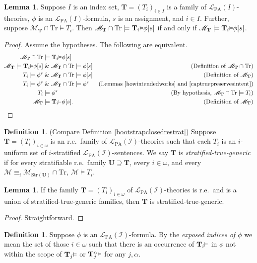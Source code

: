 \documentclass[reqno]{article}
\theoremstyle{definition}
\newtheorem{lemma}[theorem]{Lemma}
\newtheorem{definition}[theorem]{Definition}
\def\L{\mathscr{L}}
\def\M{\mathscr{M}}
\def\T{\mathbf{T}}
\def\U{\mathbf{U}}
\def\LPA{\L_{\mathrm{PA}}}
\def\indset{\mathcal I}
\def\Tr{\mathrm{Tr}}
\def\ctr{\cap\Tr}
\def\myequiv{\equiv}
\renewcommand{\Pr}[1]{\T_{#1}\mbox{\small${\vDash}$}}
\newcommand{\Prr}[2]{\T^{#1}_{#2}\mbox{\small${\vDash}$}}
\newcommand{\str}[1]{\mathrm{Str}(#1)} \newcommand{\Str}[1]{\str{#1}}
\begin{document}
\begin{lemma}
\label{captragrees}
Suppose $I$ is an index set,
$\T=(T_i)_{i\in I}$ is a family of $\LPA(I)$-theories,
$\phi$ is an $\LPA(I)$-formula, $s$ is an assignment, and $i\in I$.
Further, suppose $\M_\T\ctr\models T_i$.
Then $\M_\T\ctr\models\Pr i\phi[s]$ if and only if $\M_\T\models\Pr i\phi[s]$.
\end{lemma}

\begin{proof}
Assume the hypotheses.  The following are equivalent.
\begin{align*}
\M_\T\ctr &\models \Pr i\phi[s]\\
\M_\T \models \Pr i\phi[s] &\mathrel\& \M_\T\ctr\models \phi[s]
  &\mbox{(Definition of $\M_\T\ctr$)}\\
T_i \models \phi^s &\mathrel\& \M_\T\ctr\models \phi[s]
  &\mbox{(Definition of $\M_\T$)}\\
T_i \models \phi^s &\mathrel\& \M_\T\ctr\models \phi^s
  &\mbox{(Lemmas \ref{howintendedworks} and \ref{captruepreservesintent})}\\
T_i &\models \phi^s
  &\mbox{(By hypothesis, $\M_\T\ctr\models T_i$)}\\
\M_\T &\models \Pr i\phi[s].
  &\mbox{(Definition of $\M_\T$)}
\end{align*}
\end{proof}



\begin{definition}
(Compare Definition \ref{bootstrapclosedrestrat})
Suppose $\T=(T_i)_{i\in\omega}$ is an r.e.~family of $\LPA(\indset)$-theories
such that each $T_i$ is an $i$-uniform set of $i$-stratified $\LPA(\indset)$-sentences.
We say $\T$ is \emph{stratified-true-generic} if for every stratifiable r.e.~family
$\U\supseteq\T$, every $i\in\omega$, and every $\M\myequiv_i\M_{\str\U}\ctr$, $\M\models T_i$.
\end{definition}

\begin{lemma}
If the family $\T=(T_i)_{i\in\omega}$ of $\LPA(\indset)$-theories is r.e.~and is a union of stratified-true-generic families,
then $\T$ is stratified-true-generic.
\end{lemma}

\begin{proof}
Straightforward.
\end{proof}

\begin{definition}
Suppose $\phi$ is an $\LPA(\indset)$-formula.
By the \emph{exposed indices of $\phi$} we mean the set of those $i\in\omega$ such
that there is an occurrence of $\Pr i$ in $\phi$ not within the scope of
$\Pr j$ or $\Prr\alpha j$ for any $j,\alpha$.
\end{definition}
\end{document}
